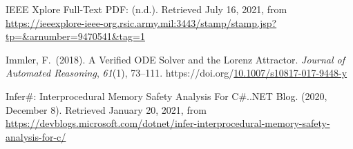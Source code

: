 \documentclass[12pt,twoside]{article}
\begin{document}
{\begin{thebibliography}{1079}
\mdbibitemlabel{}IEEE Xplore Full-Text PDF: (n.d.). Retrieved July 16, 2021, from \href{https://ieeexplore-ieee-org.rsic.army.mil:3443/stamp/stamp.jsp?tp=\%26arnumber=9470541\%26tag=1}{{\ttfamily https://\hspace{0pt}ieeexplore-\hspace{0pt}ieee-\hspace{0pt}org.\hspace{0pt}rsic.\hspace{0pt}army.\hspace{0pt}mil:3443/\hspace{0pt}stamp/\hspace{0pt}stamp.\hspace{0pt}jsp?\hspace{0pt}tp=\&\hspace{0pt}arnumber=\hspace{0pt}9470541\&\hspace{0pt}tag=\hspace{0pt}1}}%

\mdbibitemlabel{}Immler, F.~(2018). A Verified ODE Solver and the Lorenz Attractor. \emph{Journal of Automated Reasoning}, \emph{61}(1), 73–111. https://doi.org/\href{https://dx.doi.org/10.1007/s10817-017-9448-y}{10.1007/s10817-017-9448-y}%

\mdbibitemlabel{}Infer\#: Interprocedural Memory Safety Analysis For C\#..NET Blog. (2020, December 8). Retrieved January 20, 2021, from \href{https://devblogs.microsoft.com/dotnet/infer-interprocedural-memory-safety-analysis-for-c/}{{\ttfamily https://\hspace{0pt}devblogs.\hspace{0pt}microsoft.\hspace{0pt}com/\hspace{0pt}dotnet/\hspace{0pt}infer-\hspace{0pt}interprocedural-\hspace{0pt}memory-\hspace{0pt}safety-\hspace{0pt}analysis-\hspace{0pt}for-\hspace{0pt}c/\hspace{0pt}}}%


\end{thebibliography}}
\end{document}
